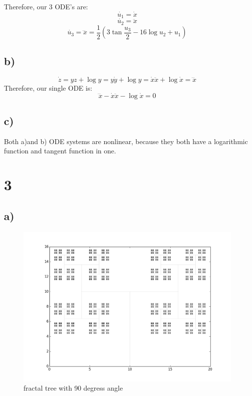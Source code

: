 \documentclass[12pt]{article}\pagestyle{myheadings}
\theoremstyle{plain}
\begin{document}
Therefore, our 3 ODE's are:
$$ \dot{u_1} = \dot{x} $$
$$\dot{u_2} = \ddot{x} $$
$$\dot{u_3} = \dddot{x} = \dfrac{1}{2} (3\tan{\frac{u_3}{2}} - 16\log{u_2} + u_1) $$

\subsection{b)}

$$\dot{z} = yz + \log{y} = y\dot{y} + \log{y} = \dot{x}\ddot{x} + \log{\dot{x}} = \dddot{x}$$
Therefore, our single ODE is:
$$\dddot{x} - \dot{x}\ddot{x} - \log{\dot{x}}=0$$


\subsection{c)}

Both a)and b) ODE systems are nonlinear, because they both have a logarithmic function and tangent function in one. 

\section{3}

\subsection{a)}

\begin{figure}[H]
\centering
\includegraphics[scale=.3]{atree}
\caption{fractal tree with 90 degress angle}
\label{fig:my_label}
\end{figure}
\end{document}
